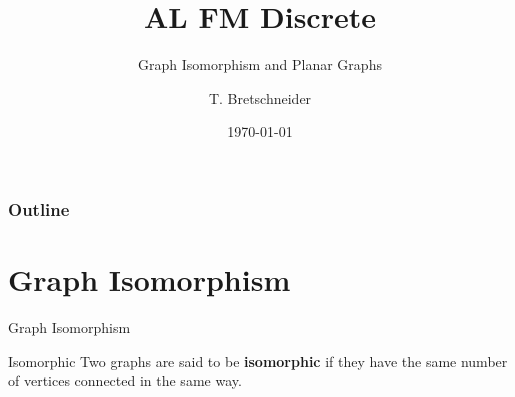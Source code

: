 \documentclass[8pt]{beamer}
\title[Discrete]{AL FM Discrete}
\subtitle{Graph Isomorphism and Planar Graphs}
\author[]{T. Bretschneider}
\date[\today]{\today}
\begin{document}
\frame{\titlepage}

\begin{frame}
\frametitle{Outline}
\tableofcontents

\end{frame}


\section{Graph Isomorphism}

\begin{frame}{Graph Isomorphism}
	\begin{alertblock}{Isomorphic}
	Two graphs are said to be \textbf{isomorphic} if they have the same number of vertices connected in the same way. 
\end{alertblock}


\end{frame}
\end{document}

